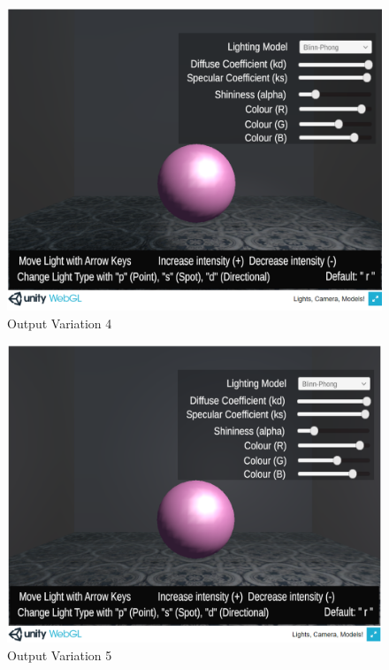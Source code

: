 \documentclass[12pt, titlepage]{article}
\begin{document}
\begin{enumerate}
	\begin{figure}[h]
		\centering
		\includegraphics[scale=0.25]{./images/fromVnVPlan/sphere-lit-spotlight-moveValidR}
		\caption{Output Variation 4}
		\label{fig:spotlight-move-right}
	\end{figure}	
	
	\begin{figure}[h]
		\centering
		\includegraphics[scale=0.25]{./images/fromVnVPlan/sphere-lit-point-moveValidR}
		\caption{Output Variation 5}
		\label{fig:point-move-right}
	\end{figure}	
	

\end{enumerate}
\end{document}
